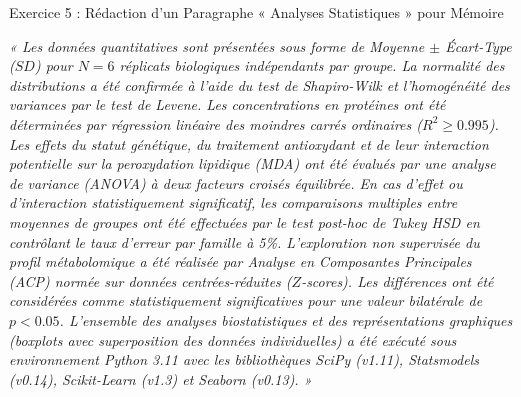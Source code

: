 \documentclass[11pt,a4paper]{article}
\begin{document}
\begin{solutionbox}{Exercice 5 : Rédaction d'un Paragraphe « Analyses Statistiques » pour Mémoire}
\begin{tcolorbox}[colback=BioNavyLight, colframe=BioNavy, title={\faEdit\quad Modèle de Rédaction Conforme aux Standards Internationaux}, width=\linewidth, boxrule=0.8pt]
\small
\textit{« Les données quantitatives sont présentées sous forme de Moyenne $\pm$ Écart-Type ($SD$) pour $N = 6$ réplicats biologiques indépendants par groupe. La normalité des distributions a été confirmée à l'aide du test de Shapiro-Wilk et l'homogénéité des variances par le test de Levene. Les concentrations en protéines ont été déterminées par régression linéaire des moindres carrés ordinaires ($R^2 \ge 0.995$). Les effets du statut génétique, du traitement antioxydant et de leur interaction potentielle sur la peroxydation lipidique (MDA) ont été évalués par une analyse de variance (ANOVA) à deux facteurs croisés équilibrée. En cas d'effet ou d'interaction statistiquement significatif, les comparaisons multiples entre moyennes de groupes ont été effectuées par le test post-hoc de Tukey HSD en contrôlant le taux d'erreur par famille à 5\%. L'exploration non supervisée du profil métabolomique a été réalisée par Analyse en Composantes Principales (ACP) normée sur données centrées-réduites ($Z$-scores). Les différences ont été considérées comme statistiquement significatives pour une valeur bilatérale de $p < 0.05$. L'ensemble des analyses biostatistiques et des représentations graphiques (boxplots avec superposition des données individuelles) a été exécuté sous environnement Python 3.11 avec les bibliothèques SciPy (v1.11), Statsmodels (v0.14), Scikit-Learn (v1.3) et Seaborn (v0.13). »}
\end{tcolorbox}
\end{solutionbox}
\end{document}
